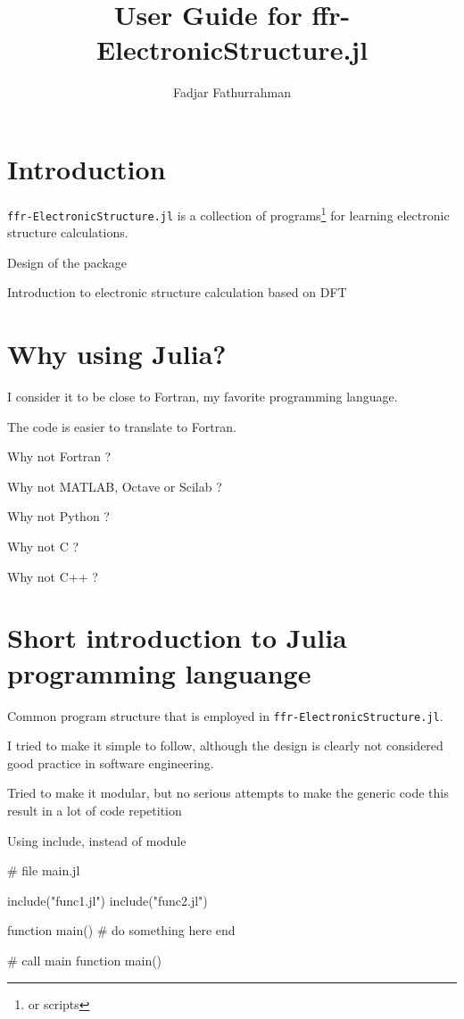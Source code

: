 \documentclass[a4paper,11pt]{extarticle}
\begin{document}
\title{User Guide for {\ttfamily ffr-ElectronicStructure.jl}}
\author{Fadjar Fathurrahman}
\date{}
\maketitle

\tableofcontents

\section{Introduction}

\verb|ffr-ElectronicStructure.jl| is a collection of programs\footnote{or scripts}
for learning electronic structure calculations.

Design of the package

Introduction to electronic structure calculation based on DFT

\section{Why using Julia?}

I consider it to be close to Fortran, my favorite programming language.

The code is easier to translate to Fortran.

Why not Fortran ?

Why not MATLAB, Octave or Scilab ?

Why not Python ?

Why not C ?

Why not C++ ?


\section{Short introduction to Julia programming languange}

Common program structure that is employed in {\tt ffr-ElectronicStructure.jl}.

I tried to make it simple to follow, although the design is clearly not considered
good practice in software engineering.

Tried to make it modular, but no serious attempts to make the generic code
this result in a lot of code repetition

Using include, instead of module

\begin{juliacode}
# file main.jl

include("func1.jl")
include("func2.jl")

function main()
  # do something here
end

# call main function
main()
\end{juliacode}


\end{document}
